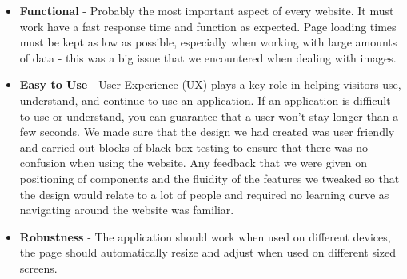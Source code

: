 \begin{itemize}

\item \textbf{Functional} - Probably the most important aspect of every website. It must work have a fast response time and function as expected. Page loading times must be kept as low as possible, especially when working with large amounts of data - this was a big issue that we encountered when dealing with images.
\item \textbf{Easy to Use} - User Experience (UX) plays a key role in helping visitors use, understand, and continue to use an application. If an application is difficult to use or understand, you can guarantee that a user won't stay longer than a few seconds. We made sure that the design we had created was user friendly and carried out blocks of black box testing to ensure that there was no confusion when using the website. Any feedback that we were given on positioning of components and the fluidity of the features we tweaked so that the design would relate to a lot of people and required no learning curve as navigating around the website was familiar.
\item \textbf{Robustness} - The application should work when used on different devices, the page should automatically resize and adjust when used on different sized screens.


\end{itemize}
